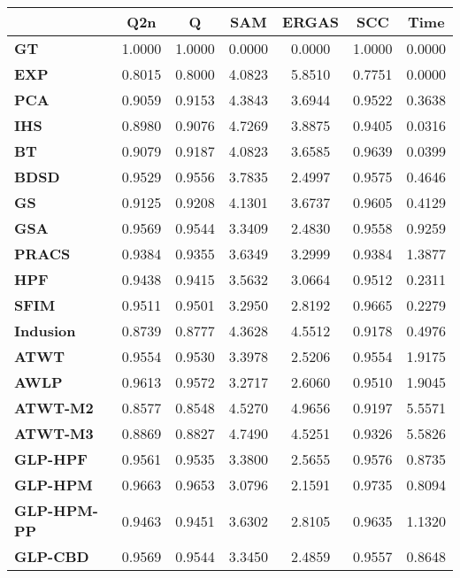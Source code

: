 \begin{tabular}{|l|c|c|c|c|c|c|}
\hline
&\textbf{Q2n}&\textbf{Q}&\textbf{SAM}&\textbf{ERGAS}&\textbf{SCC}&\textbf{Time}\\\hline
\textbf{GT}&1.0000&1.0000&0.0000&0.0000&1.0000&0.0000\\\hline
\textbf{EXP}&0.8015&0.8000&4.0823&5.8510&0.7751&0.0000\\\hline
\textbf{PCA}&0.9059&0.9153&4.3843&3.6944&0.9522&0.3638\\\hline
\textbf{IHS}&0.8980&0.9076&4.7269&3.8875&0.9405&0.0316\\\hline
\textbf{BT}&0.9079&0.9187&4.0823&3.6585&0.9639&0.0399\\\hline
\textbf{BDSD}&0.9529&0.9556&3.7835&2.4997&0.9575&0.4646\\\hline
\textbf{GS}&0.9125&0.9208&4.1301&3.6737&0.9605&0.4129\\\hline
\textbf{GSA}&0.9569&0.9544&3.3409&2.4830&0.9558&0.9259\\\hline
\textbf{PRACS}&0.9384&0.9355&3.6349&3.2999&0.9384&1.3877\\\hline
\textbf{HPF}&0.9438&0.9415&3.5632&3.0664&0.9512&0.2311\\\hline
\textbf{SFIM}&0.9511&0.9501&3.2950&2.8192&0.9665&0.2279\\\hline
\textbf{Indusion}&0.8739&0.8777&4.3628&4.5512&0.9178&0.4976\\\hline
\textbf{ATWT}&0.9554&0.9530&3.3978&2.5206&0.9554&1.9175\\\hline
\textbf{AWLP}&0.9613&0.9572&3.2717&2.6060&0.9510&1.9045\\\hline
\textbf{ATWT-M2}&0.8577&0.8548&4.5270&4.9656&0.9197&5.5571\\\hline
\textbf{ATWT-M3}&0.8869&0.8827&4.7490&4.5251&0.9326&5.5826\\\hline
\textbf{GLP-HPF}&0.9561&0.9535&3.3800&2.5655&0.9576&0.8735\\\hline
\textbf{GLP-HPM}&0.9663&0.9653&3.0796&2.1591&0.9735&0.8094\\\hline
\textbf{GLP-HPM-PP}&0.9463&0.9451&3.6302&2.8105&0.9635&1.1320\\\hline
\textbf{GLP-CBD}&0.9569&0.9544&3.3450&2.4859&0.9557&0.8648\\\hline
\end{tabular}
